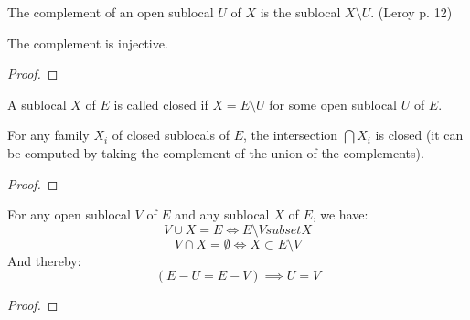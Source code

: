 \begin{definition}[Complement]
    \label{def:complement}
    \leanok
    The complement of an open sublocal $U$ of $X$ is the sublocal $X \setminus U$.
    (Leroy p. 12) 
\end{definition}

\begin{lemma}
    \label{lem:complement_injective}
    \leanok
    The complement is injective.
\end{lemma}
\begin{proof}
    \leanok
\end{proof}

\begin{definition}
    \label{def:closed_sublocal}
    \leanok
    A sublocal $X$ of $E$ is called closed if $X = E \setminus U$ for some open sublocal $U$ of $E$.
\end{definition}

\begin{lemma}
    \label{lem:closed_intersection}
    \leanok
    For any family $X_i$ of closed sublocals of $E$, the intersection $\bigcap X_i$ is closed (it can be computed by
    taking the complement of the union of the complements).
\end{lemma}
\begin{proof}
    \leanok
\end{proof}


\begin{lemma}
    \label{lem:properties_of_complements}
    \leanok
    For any open sublocal $V$ of $E$ and any sublocal $X$ of $E$, we have:
    \[V \cup X = E \iff E \setminus V subset X\]
    \[V \cap X = \emptyset \iff X \subset E \setminus V\]
    And thereby:
    \[(E - U = E - V) \implies U = V\]
\end{lemma}
\begin{proof}
    \leanok
\end{proof}

